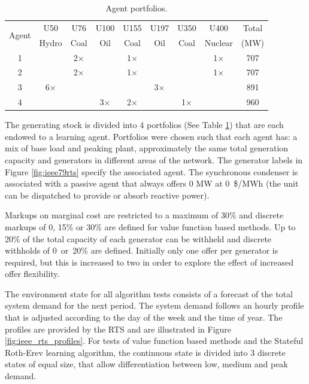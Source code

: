 \begin{table}
\caption{Agent portfolios.}
\label{tbl:agent_portfolios}
\begin{center}
\begin{tabular}{c|c|c|c|c|c|c|c|c}
\hline
\multirow{2}{*}{Agent} &U50 &U76 &U100 &U155 &U197 &U350 &U400 &Total \\
 &Hydro &Coal &Oil &Coal &Oil &Coal &Nuclear &(MW) \\
\hline\hline
1 & &2$\times$ & &1$\times$ & & &1$\times$ &707 \\
2 & &2$\times$ & &1$\times$ & & &1$\times$ &707 \\
3 &6$\times$ & & & &3$\times$ & & &891 \\
4 & & &3$\times$ &2$\times$ & &1$\times$ & &960 \\
\hline
\end{tabular}
\end{center}
\end{table}

The generating stock is divided into 4 portfolios (See Table
\ref{tbl:agent_portfolios}) that are each endowed to a learning agent.
Portfolios were chosen such that each agent has: a mix of base load and peaking
plant, approximately the same total generation capacity and generators in
different areas of the network.  The generator labels in Figure
\ref{fig:ieee79rts} specify the associated agent.  The synchronous condenser is
associated with a passive agent that always offers 0 MW at 0~\$/MWh (the
unit can be dispatched to provide or absorb reactive power).


Markups on marginal cost are restricted to a maximum of 30\% and discrete
markups of 0, 15\% or 30\% are defined for value function based methods.  Up to
20\% of the total capacity of each generator can be withheld and discrete
withholds of 0~or~20\% are defined.  Initially only one offer per generator is
required, but this is increased to two in order to explore the effect of
increased offer flexibility.

The environment state for all algorithm tests consists of a forecast of the
total system demand for the next period.  The system demand follows an hourly
profile that is adjusted according to the day of the week and the time of year.
The profiles are provided by the RTS and are illustrated in Figure
\ref{fig:ieee_rts_profiles}.  For tests of value function based methods and the
Stateful Roth-Erev learning algorithm, the continuous state is divided into 3
discrete states of equal size, that allow differentiation between low, medium
and peak demand.

